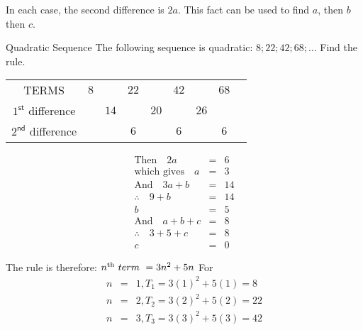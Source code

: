 In each case, the second difference is $2a$.
This fact can be used to find $a$, then $b$ then $c$.

\begin{wex}{Quadratic Sequence}
{The following sequence is quadratic: $8; 22; 42; 68; \ldots$
Find the rule.}{
\begin{center}
\begin{tabular}{ccccccccc}
TERMS & $8$ && $22$ && $42$ && $68$ & \\
$1^{\textsf{st}}$ difference && $14$ && $20$ && $26$ \\ 
$2^{\textsf{nd}}$ difference &&& $6$ && $6$ && $6$ & \\
\end{tabular}
\end{center}

\begin{eqnarray*}
\textrm{Then} \quad  2a &=& 6 \\
\textrm{which gives} \quad a &=& 3\\
\textrm{And} \quad  3a + b &=& 14\\   
\therefore \quad 9 + b &=& 14  \\
 b &=& 5\\
\textrm{And} \quad  a + b + c  &=& 8\\  
\therefore \quad 3 + 5 + c &=& 8\\
 c &=& 0
\end{eqnarray*}

The rule is therefore: \quad $n^{\rm th} ~term~ = 3n^2 + 5n$
For
\begin{eqnarray*}
n &=& 1, T_1 = 3(1)^2 + 5(1) = 8\\
n &=& 2, T_2 = 3(2)^2 + 5(2) = 22\\
n &=& 3, T_3 = 3(3)^2 + 5(3) = 42
\end{eqnarray*}
}
\end{wex}


